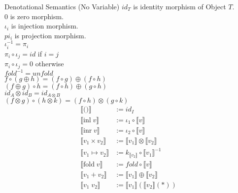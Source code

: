 \documentclass[10pt]{jsarticle}
\newcommand{\semantics}[1]{{\llbracket #1 \rrbracket}}
\begin{document}
\begin{itembox}[c]{Denotational Semantics (No Variable)}
$id_T$ is identity morphism of Object $T$. \\
$0$ is zero morphism. \\
$\iota_i$ is injection morphism. \\
$pi_i$ is projection morphism. \\
$\iota_i^{-1} = \pi_i$ \\
$\pi_i\circ\iota_j = id$ if $i = j$ \\
$\pi_i\circ\iota_j = 0$ otherwise \\
$fold^{-1} = unfold$ \\
$f \circ (g \oplus h) = (f \circ g) \oplus (f \circ h)$ \\
$(f \oplus g) \circ h = (f \circ h) \oplus (g \circ h)$ \\
$id_A \otimes id_B = id_{A \otimes B}$ \\
$(f \otimes g) \circ (h \otimes k) = (f \circ h) \otimes (g \circ k)$ \\
  \begin{align*}
    \semantics{\text{()}}       &:= id_I \\
    \semantics{\text{inl}\;v}   &:= \iota_1\circ\semantics{v} \\
    \semantics{\text{inr}\;v}   &:= \iota_2\circ\semantics{v} \\
    \semantics{v_1\times{}v_2}  &:= \semantics{v_1}\otimes\semantics{v_2} \\
    \semantics{v_1\mapsto{}v_2} &:= k_\semantics{v_2}\circ\semantics{v_1}^{-1} \\
    \semantics{\text{fold}\;v}  &:= fold\circ\semantics{v} \\
    \semantics{v_1 + v_2}       &:= \semantics{v_1}\oplus\semantics{v_2} \\
    \semantics{v_1\;v_2}        &:= \semantics{v_1}(\semantics{v_2}(\ast))
  \end{align*}
\end{itembox}
\end{document}
